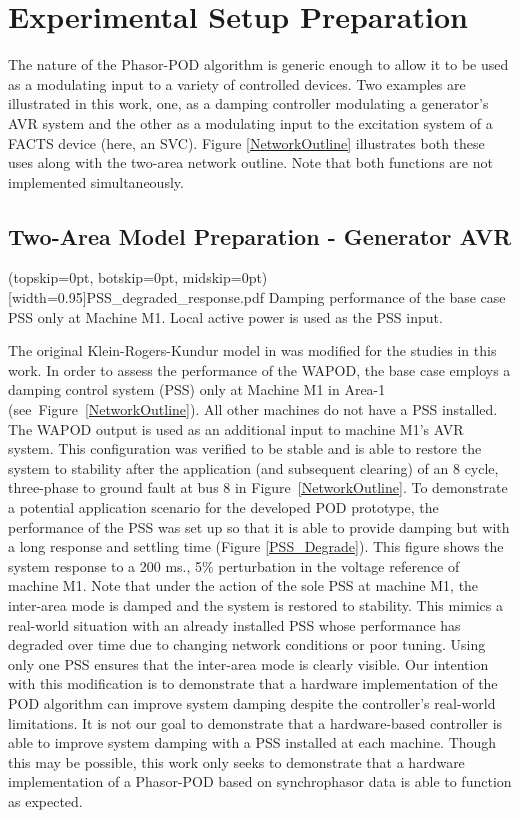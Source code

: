 \documentclass{ieeeaccess}
\begin{document}
\section{Experimental Setup Preparation}\label{SetupPreparation}

The nature of the Phasor-POD algorithm is generic enough to allow it to be used as a modulating input to a variety of controlled devices. Two examples are illustrated in this work, one, as a damping controller modulating a generator\rq{s} AVR system and the other as a modulating input to the excitation system of a FACTS device (here, an SVC). Figure \ref{NetworkOutline} illustrates both these uses along with the two-area network outline. Note that both functions are not implemented simultaneously.

\subsection{Two-Area Model Preparation - Generator AVR}

\Figure[tbp!](topskip=0pt, botskip=0pt, midskip=0pt)[width=0.95\columnwidth]{PSS_degraded_response.pdf}
{Damping performance of the base case PSS only at Machine M1. Local active power is used as the PSS input.\label{PSS_Degrade}}

The original Klein-Rogers-Kundur model in \cite{KundurTwoArea} was modified for the studies in this work. In order to assess the performance of the WAPOD, the base case employs a damping control system (PSS) only at Machine M1 in Area-1 (see~Figure~\ref{NetworkOutline}). All other machines do not have a PSS installed. The WAPOD output is used as an additional input to machine M1\rq{s} AVR system. This configuration was  verified to be stable and is able to restore the system to stability after the application (and subsequent clearing) of an 8 cycle, three-phase to ground fault at bus 8 in Figure~\ref{NetworkOutline}. To demonstrate a potential application scenario for the developed POD prototype, the performance of the PSS was set up so that it is able to provide damping but with a long response and settling time (Figure \ref{PSS_Degrade}). This figure shows the system response to a 200 ms., 5\% perturbation in the voltage reference of machine M1. Note that under the action of the sole PSS at machine M1, the inter-area mode is damped and the system is restored to stability. This mimics a real-world situation with an already installed PSS whose performance has degraded over time due to changing network conditions or poor tuning. Using only one PSS ensures that the inter-area mode is clearly visible. Our intention with this modification is to demonstrate that a hardware implementation of the POD algorithm can improve system damping despite the controller\rq{s} real-world limitations. It is not our goal to demonstrate that a hardware-based controller is able to improve system damping with a PSS installed at each machine. Though this may be possible, this work only seeks to demonstrate that a hardware implementation of a Phasor-POD based on synchrophasor data is able to function as expected.
\end{document}
